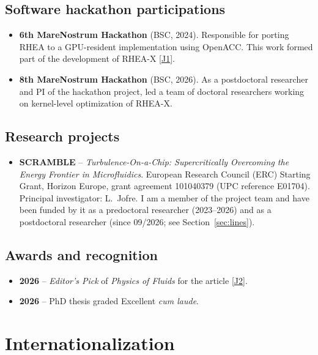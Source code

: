 \documentclass[11pt]{article}
\newcommand{\NEW}[1]{\iffinal #1\else{\color{red}#1}\fi} %
\begin{document}
\subsection{Software hackathon participations}
\begin{itemize}
\item \textbf{6th MareNostrum Hackathon} (BSC, 2024).
Responsible for porting RHEA to a GPU-resident implementation using OpenACC. This work formed part of
the development of RHEA-X [\hyperlink{pub-J1}{J1}].\nocert

\item \textbf{8th MareNostrum Hackathon} (BSC, 2026).
As a postdoctoral researcher and PI of the hackathon project, led a team of doctoral researchers working on kernel-level optimization of RHEA-X.\nocert
\end{itemize}

\subsection{Research projects}\label{sec:projects}
\begin{itemize}
  \item \textbf{SCRAMBLE} -- \emph{Turbulence-On-a-Chip: Supercritically Overcoming the
  Energy Frontier in Microfluidics}. European Research Council (ERC) Starting Grant,
  Horizon Europe, grant agreement 101040379 (UPC reference E01704). Principal
  investigator: L.\ Jofre. I am a member of the project team and have been funded by it
  as a predoctoral researcher (2023--2026) and as a postdoctoral researcher (since
  09/2026\NEW{;} see Section~\ref{sec:lines}). 
\end{itemize}

\subsection{Awards and recognition}
\begin{itemize}
  \item \textbf{2026} -- \emph{Editor's Pick} of \emph{Physics of Fluids} for the article
  [\hyperlink{pub-J2}{J2}].
  \item \textbf{2026} -- PhD thesis graded Excellent \emph{cum laude}.
\end{itemize}

\section{Internationalization}
\end{document}
